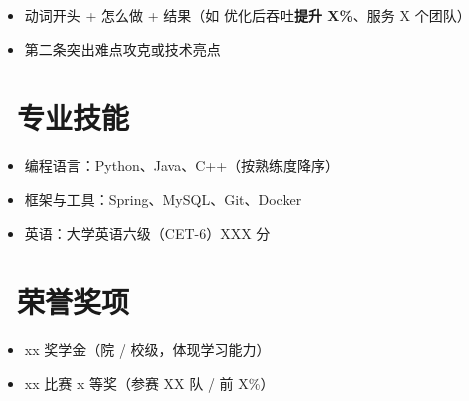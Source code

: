 \documentclass{resume}
\begin{document}
\begin{itemize}
  \item 动词开头 + 怎么做 + 结果（如 优化后吞吐\textbf{提升 X\%}、服务 X 个团队）
  \item 第二条突出难点攻克或技术亮点
\end{itemize}

\section{\faCogs\ 专业技能}
\begin{itemize}[parsep=0.5ex]
  \item 编程语言：Python、Java、C++（按熟练度降序）
  \item 框架与工具：Spring、MySQL、Git、Docker
  \item 英语：大学英语六级（CET-6）XXX 分
\end{itemize}

\section{\faHeartO\ 荣誉奖项}
\begin{itemize}[parsep=0.5ex]
  \item xx 奖学金（院 / 校级，体现学习能力）
  \item xx 比赛 x 等奖（参赛 XX 队 / 前 X\%）
\end{itemize}

\end{document}
